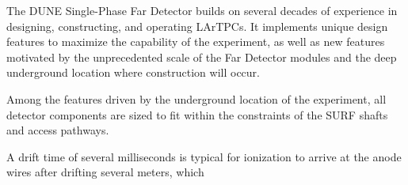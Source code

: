 The DUNE Single-Phase Far Detector builds on several decades of experience in designing, constructing, and operating LArTPCs.  It implements unique design features to maximize the capability of the experiment, as well as new features motivated by the unprecedented scale of the Far Detector modules and the deep underground location where construction will occur.

Among the features driven by the underground location of the experiment, all detector components are sized to fit within the constraints of the SURF shafts and access pathways.

A drift time of several milliseconds is typical for ionization to arrive at the anode wires after drifting several meters, which 






